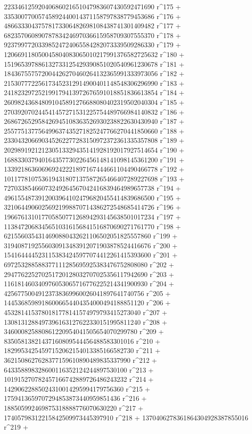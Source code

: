        22334612592040686021651047983607430592471690 r^175 + 
       33530077005745892440014371158797838779453686 r^176 + 
       48663330437578173306482698108438741301409482 r^177 + 
       68235706089078783424697036615958709307555370 r^178 + 
       92379977203398524724065584282073339509286330 r^179 + 
       120669118050045804083065010217991376582725632 r^180 + 
       151965397886132733125429390851020540961230678 r^181 + 
       184367557572004426270460264132365991333973056 r^182 + 
       215307772256173452312914900401148548306296990 r^183 + 
       241823297252199179413972676591018851836613854 r^184 + 
       260982436848091045891276688080402319502040304 r^185 + 
       270392070244541457271531225754489766984140832 r^186 + 
       268672652958426945108363526930238822630430940 r^187 + 
       255775137756499637435271825247766270441850660 r^188 + 
       233043206690345262277283150972372361335357808 r^189 + 
       202989192121230513329435141928192017927514654 r^190 + 
       168833037940164357730226456148141098145361200 r^191 + 
       133921863606969242221897167444661104490466778 r^192 + 
       101177810753619431807137587265466407289227698 r^193 + 
       72703385466073249264567042416839464989657738 r^194 + 
       49615548739120039641024796820455414839686500 r^195 + 
       32106449060256921998870714386272548685414726 r^196 + 
       19667613101770585077126894293145638501017234 r^197 + 
       11384720683456510316156841516870690271761770 r^198 + 
       6215560354314690880432621106502051825557860 r^199 + 
       3194087192556030913483912071903878524416676 r^200 + 
       1541644445231153834245977074412261415393600 r^201 + 
       697253288588377111285695925383476752808080 r^202 + 
       294776225270251720128032707025356117942690 r^203 + 
       116181460340976053065716776225214341900930 r^204 + 
       42567750049123738369960026041897641740756 r^205 + 
       14453685989186006654404354000494188851120 r^206 + 
       4532814153780181778141574979793415273040 r^207 + 
       1308131288497396163127622330151995811240 r^208 + 
       346000825880861220954041505654070299780 r^209 + 
       83505813821437160809544456488583301016 r^210 + 
       18299534254597152062154013385166582730 r^211 + 
       3621508627628377159610890489835337990 r^212 + 
       643358898328600116352124244897530100 r^213 + 
       101915270782457166742889726486243232 r^214 + 
       14290622885024310014295994179756360 r^215 + 
       1759413659707294853873440959851436 r^216 + 
       188505992469875318888776070630220 r^217 + 
       17405798312215842509973445397910 r^218 + 
       1370406278361864304928387855016 r^219 + 
